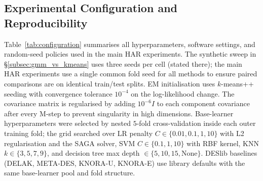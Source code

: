 \documentclass[lettersize,journal]{IEEEtran}
\begin{document}
	\subsection{Experimental Configuration and Reproducibility}\label{subsec:config}

	\noindent Table~\ref{tab:configuration} summarises all hyperparameters, software settings, and random-seed policies used in the main HAR experiments. The synthetic sweep in \S\ref{subsec:gmm_vs_kmeans} uses three seeds per cell (stated there); the main HAR experiments use a single common fold seed for all methods to ensure paired comparisons are on identical train/test splits. EM initialisation uses $k$-means++ seeding with convergence tolerance $10^{-4}$ on the log-likelihood change. The covariance matrix is regularised by adding $10^{-6} I$ to each component covariance after every M-step to prevent singularity in high dimensions. Base-learner hyperparameters were selected by nested $5$-fold cross-validation inside each outer training fold; the grid searched over LR penalty $C \in \{0.01, 0.1, 1, 10\}$ with L2 regularisation and the SAGA solver, SVM $C \in \{0.1, 1, 10\}$ with RBF kernel, KNN $k \in \{3, 5, 7, 9\}$, and decision tree max depth $\in \{5, 10, 15, \text{None}\}$. DESlib baselines (DELAK, META-DES, KNORA-U, KNORA-E) use library defaults with the same base-learner pool and fold structure.
\end{document}

